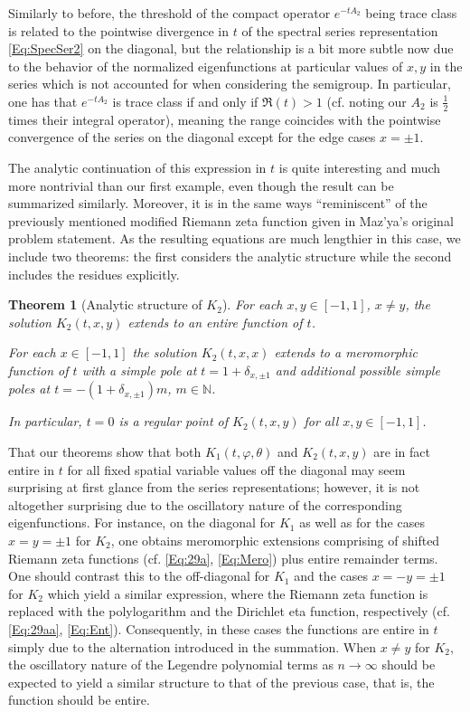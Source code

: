 \documentclass[letterpaper,10pt]{amsart}
\newtheorem{thm}{Theorem}[section]
\numberwithin{equation}{section}
\begin{document}
Similarly to before, the threshold of the compact operator $e^{-t A_2}$ being trace class is related to the pointwise divergence in $t$ of the spectral series representation \eqref{Eq:SpecSer2} on the diagonal, but the relationship is a bit more subtle now due to the behavior of the normalized eigenfunctions at particular values of $x,y$ in the series which is not accounted for when considering the semigroup. In particular, one has that $e^{-t A_2}$ is trace class if and only if $\Re(t)>1$ (cf. \cite[Prop. 5.8]{GM25} noting our $A_2$ is $\frac{1}{2}$ times their integral operator), meaning the range coincides with the pointwise convergence of the series on the diagonal except for the edge cases $x=\pm1$.

The analytic continuation of this expression in $t$ is quite interesting and much more nontrivial than our first example, even though the result can be summarized similarly.
Moreover, it is in the same ways ``reminiscent'' of the previously mentioned modified Riemann zeta function given in Maz'ya's original problem statement.
As the resulting equations are much lengthier in this case, we include two theorems: the first considers the analytic structure while the second includes the residues explicitly.

\begin{thm}[Analytic structure of $K_2$]\label{Thm:Main}
    For each $x,y \in [-1,1]$, $x\neq y$, the solution $K_2(t,x,y)$ extends to an entire function of $t$. 

    For each $x \in [-1,1]$ the solution $K_2(t,x,x)$ extends to a meromorphic function of $t$ with a simple pole at $t=1+\delta_{x,\pm1}$ and additional possible simple poles at $t=-(1+\delta_{x,\pm1})m$, $m\in\mathbb{N}$.

    In particular, $t=0$ is a regular point of $K_2(t,x,y)$ for all $x,y\in[-1,1]$.
\end{thm}

That our theorems show that both $K_1(t,\varphi,\theta)$ and $K_2(t,x,y)$ are in fact entire in $t$ for all fixed spatial variable values off the diagonal may seem surprising at first glance from the series representations; however, it is not altogether surprising due to the oscillatory nature of the corresponding eigenfunctions. 
For instance, on the diagonal for $K_1$ as well as for the cases $x=y=\pm1$ for $K_2$, one obtains meromorphic extensions comprising of shifted Riemann zeta functions (cf. \eqref{Eq:29a}, \eqref{Eq:Mero}) plus entire remainder terms. One should contrast this to the off-diagonal for $K_1$ and the cases $x=-y=\pm1$ for $K_2$ which yield a similar expression, where the Riemann zeta function is replaced with the polylogarithm and the Dirichlet eta function, respectively (cf. \eqref{Eq:29aa}, \eqref{Eq:Ent}). Consequently, in these cases the functions are entire in $t$ simply due to the alternation introduced in the summation. When $x\neq y$ for $K_2$, the oscillatory nature of the Legendre polynomial terms as $n\to\infty$ should be expected to yield a similar structure to that of the previous case, that is, the function should be entire.
\end{document}
